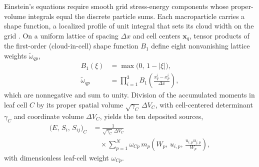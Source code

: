 Einstein's equations require smooth grid stress-energy components whose proper-volume integrals equal the discrete particle sums. Each macroparticle carries a shape function, a localized profile of unit integral that sets its cloud width on the grid \cite{1988csup.book.....H,1991ppcs.book.....B}. On a uniform lattice of spacing $\Delta x$ and cell centers $\bm{x}_q$, tensor products of the first-order (cloud-in-cell) shape function $B_1$ define eight nonvanishing lattice weights $\tilde{\omega}_{qp}$,
\begin{align}\label{eq:cic_shape}
B_1(\xi) &= \max\bigl(0,\, 1 - |\xi|\bigr), \nonumber\\
\tilde{\omega}_{qp} &= \prod_{i=1}^{3} B_1\!\left(\frac{x_q^i - x_p^i}{\Delta x}\right),
\end{align}
which are nonnegative and sum to unity. Division of the accumulated moments in leaf cell $C$ by its proper spatial volume $\sqrt{\gamma_C}\,\Delta V_C$, with cell-centered determinant $\gamma_C$ and coordinate volume $\Delta V_C$, yields the ten deposited sources,
\begin{align}\label{eq:deposited_sources}
\bigl(E,\, S_i,\, S_{ij}\bigr)_C &= \frac{1}{\sqrt{\gamma_C}\,\Delta V_C} \nonumber\\
&\quad \times \sum_{p=1}^{N} \omega_{Cp}\, m_p \left(W_p,\, u_{i,p},\, \frac{u_{i,p} u_{j,p}}{W_p}\right),
\end{align}
with dimensionless leaf-cell weight $\omega_{Cp}$.

